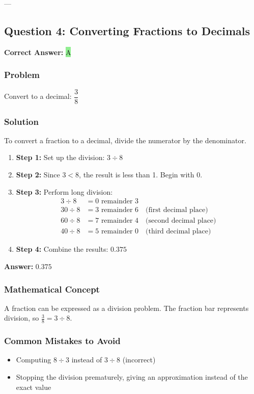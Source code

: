 \documentclass[12pt]{article}
\begin{document}
---

\subsection{Question 4: Converting Fractions to Decimals}

\textbf{Correct Answer: } \colorbox{lightgreen}{A}

\subsubsection*{Problem}
Convert to a decimal: $\dfrac{3}{8}$

\subsubsection*{Solution}

To convert a fraction to a decimal, divide the numerator by the denominator.

\begin{enumerate}
\item \textbf{Step 1:} Set up the division: $3 \div 8$
\item \textbf{Step 2:} Since $3 < 8$, the result is less than 1. Begin with $0.$
\item \textbf{Step 3:} Perform long division:
  \begin{align*}
  3 \div 8 &= 0 \text{ remainder } 3 \\
  30 \div 8 &= 3 \text{ remainder } 6 \quad \text{(first decimal place)} \\
  60 \div 8 &= 7 \text{ remainder } 4 \quad \text{(second decimal place)} \\
  40 \div 8 &= 5 \text{ remainder } 0 \quad \text{(third decimal place)}
  \end{align*}
\item \textbf{Step 4:} Combine the results: $0.375$
\end{enumerate}

\textbf{Answer: } $0.375$

\subsubsection*{Mathematical Concept}
A fraction can be expressed as a division problem. The fraction bar represents division, so $\frac{3}{8} = 3 \div 8$.

\subsubsection*{Common Mistakes to Avoid}
\begin{itemize}
\item Computing $8 \div 3$ instead of $3 \div 8$ (incorrect)
\item Stopping the division prematurely, giving an approximation instead of the exact value
\end{itemize}
\end{document}
